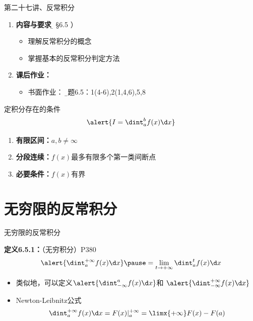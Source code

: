 \begin{frame}{第二十七讲、反常积分}
	\linespread{1.5}
	\begin{enumerate}
	  \item {\bf 内容与要求}{\b（ \S 6.5 ）}
	  \begin{itemize}
	    \item 理解反常积分的概念
	    \item 掌握基本的反常积分判定方法
	  \vspace{1em}
	  \end{itemize}
	  \item {\bf 课后作业：}
	  \begin{itemize}
 	    \item 书面作业：
	     {\b 习题6.5：1(4-6),2(1,4,6),5,8}
	  \end{itemize}
	\end{enumerate}
\end{frame}

\begin{frame}{定积分存在的条件}
	\linespread{1.5}
	$$\alert{I=\dint_a^bf(x)\d x}$$
	\begin{enumerate}\pause 
	  \item {\bf 有限区间：}$a,b\ne \infty$\pause 
	  \item {\bf 分段连续：}$f(x)$最多有限多个第一类间断点\pause 
	    \item {\bf 必要条件：}$f(x)$有界
	\end{enumerate}
\end{frame}

\section{无穷限的反常积分}

\begin{frame}{无穷限的反常积分}
	\linespread{1.2}\pause 
	\begin{block}{{\bf 定义6.5.1：}（无穷积分）\hfill P380}
		$$\alert{\dint_a^{+\infty}f(x)\d x}\pause
		=\lim\limits_{t\to+\infty}\dint_a^tf(x)\d x$$ \end{block}\pause 
	\begin{itemize}
	  \item 类似地，可以定义$\alert{\dint_{-\infty}^af(x)\d x}$和
		$\alert{\dint_{-\infty}^{+\infty}f(x)\d x}$\pause 
	  \item Newton-Leibnitz公式\pause 
	  $$\dint_a^{+\infty}f(x)\d x=F(x)|_{a}^{+\infty}
	  =\limx{+\infty}F(x)-F(a)$$
	\end{itemize}
\end{frame}

